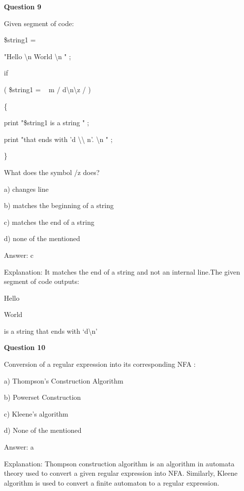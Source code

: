 \documentclass{article}
\begin{document}
\begin{mdframed}[linewidth=1pt, roundcorner=5pt, linecolor=gray!30, backgroundcolor=gray!5]
\textbf{Question 9} 

Given segment of code:


\$string1 
=
 
"Hello
\textbackslash n
World
\textbackslash n
"
;


if
 
(
\$string1 
=
~ m
/
d\textbackslash n\textbackslash z
/
)
 
\{

  print 
"\$string1 is a string "
;

  print 
"that ends with 'd
\textbackslash \textbackslash 
n'.
\textbackslash n
"
;


\}


What does the symbol /z does?

a) changes line

b) matches the beginning of a string

c) matches the end of a string

d) none of the mentioned
\vspace{5pt} \par
\begin{tcolorbox}[colback=green!5, colframe=green!40!black, title=Solution]
Answer: c

Explanation: It matches the end of a string and not an internal line.The given segment of code outputs:

Hello

World

 is a string that ends with ‘d\textbackslash n'
\end{tcolorbox}
\end{mdframed}

\begin{mdframed}[linewidth=1pt, roundcorner=5pt, linecolor=gray!30, backgroundcolor=gray!5]
\textbf{Question 10} 

Conversion of a regular expression into its corresponding NFA :

a) Thompson's Construction Algorithm

b) Powerset Construction

c) Kleene's algorithm

d) None of the mentioned
\vspace{5pt} \par
\begin{tcolorbox}[colback=green!5, colframe=green!40!black, title=Solution]
Answer: a

Explanation: Thompson construction algorithm is an algorithm in automata theory used to convert a given regular expression into NFA. Similarly, Kleene algorithm is used to convert a finite automaton to a regular expression.
\end{tcolorbox}
\end{mdframed}
\newpage
\end{document}
